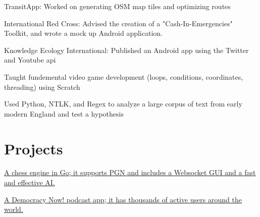 \documentclass[]{deedy-resume-openfont}
\begin{document}
\begin{tightemize}
\item TransitApp: Worked on generating OSM map tiles and optimizing routes
\item International Red Cross: Advised the creation of a "Cash-In-Emergencies" Toolkit, and wrote a mock up Android application.
\item Knowledge Ecology International: Published an Android app using the Twitter and Youtube api
\end{tightemize}
\sectionsep

\begin{tightemize}
\item Taught fundemental video game development (loops, conditions, coordinates, threading) using Scratch
\end{tightemize}
\sectionsep

\begin{tightemize}
\item Used Python, NTLK, and Regex to analyze a large corpus of text from early modern England and test a hypothesis
\end{tightemize}


\section{Projects}
\href{https://ghess-chess.herokuapp.com/}{A chess engine in Go; it supports PGN and includes a Websocket GUI and a fast and effective AI.}
\sectionsep

\href{https://play.google.com/store/apps/details?id=com.workingagenda.democracydroid}{A Democracy Now! podcast app; it has thousands of active users around the world.}
\sectionsep
\end{document}
